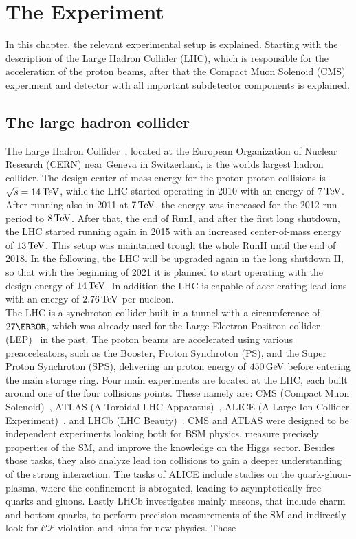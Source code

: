 \chapter{The Experiment}\label{chap:experiment}
In this chapter, the relevant experimental setup is explained. Starting with the description of the Large Hadron Collider (LHC), which is responsible for the acceleration of the proton beams, after that the Compact Muon Solenoid (CMS) experiment and detector with all important subdetector components is explained.
\section{The large hadron collider}\label{sec:LHC}
The Large Hadron Collider~\cite{LHC1,LHC2}, located at the European Organization of Nuclear Research (CERN) near Geneva in Switzerland, is the worlds largest hadron collider. The design center-of-mass energy for the proton-proton collisions is $\sqrt{s}=14\,\text{Te\hspace{-.08em}V}$, while the LHC started operating in 2010 with an energy of $7\,\text{Te\hspace{-.08em}V}$. After running also in 2011 at $7\,\text{Te\hspace{-.08em}V}$, the energy was increased for the 2012 run period to $8\,\text{Te\hspace{-.08em}V}$. After that, the end of RunI, and after the first long shutdown, the LHC started running again in 2015 with an increased center-of-mass energy of $13\,\text{Te\hspace{-.08em}V}$. This setup was maintained trough the whole RunII until the end of 2018. In the following, the LHC will be upgraded again in the long shutdown II, so that with the beginning of 2021 it is planned to start operating with the design energy of $14\,\text{Te\hspace{-.08em}V}$.
In addition the LHC is capable of accelerating lead ions with an energy of $2.76\,\text{Te\hspace{-.08em}V}$ per nucleon.\\
The LHC is a synchroton collider built in a tunnel with a circumference of $27\km$, which was already used for the Large Electron Positron collider (LEP)~\cite{LEPCollider} in the past. The proton beams are accelerated using various preacceleators, such as the Booster, Proton Synchroton (PS), and the Super Proton Synchroton (SPS), delivering an proton energy of $450\,\text{Ge\hspace{-.08em}V}$ before entering the main storage ring. Four main experiments are located at the LHC, each built around one of the four collisions points. These namely are: CMS (Compact Muon Solenoid)~\cite{CMS}, ATLAS (A Toroidal LHC Apparatus)~\cite{ATLAS}, ALICE (A Large Ion Collider Experiment)~\cite{ATLAS}, and LHCb (LHC Beauty)~\cite{LHCb}. CMS and ATLAS were designed to be independent experiments looking both for BSM physics, measure precisely properties of the SM, and improve the knowledge on the Higgs sector. Besides those tasks, they also analyze lead ion collisions to gain a deeper understanding of the strong interaction. The tasks of ALICE include studies on the quark-gluon-plasma, where the confinement is abrogated, leading to asymptotically free quarks and gluons. Lastly LHCb investigates mainly mesons, that include charm and bottom quarks, to perform precision measurements of the SM and indirectly look for $\mathcal{CP}$-violation and hints for new physics. Those 



